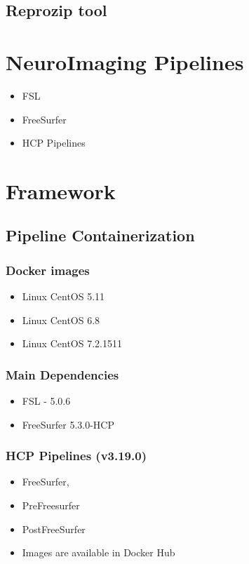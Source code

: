 \subsection{Reprozip tool}

\section{NeuroImaging Pipelines}
\begin{itemize}
 \item FSL
 \item FreeSurfer
 \item HCP Pipelines
\end{itemize}

\section{Framework}
\subsection{Pipeline Containerization}
\subsubsection{Docker images}
\begin{itemize}
  \item Linux CentOS 5.11
  \item Linux CentOS 6.8 
  \item Linux CentOS 7.2.1511
\end{itemize}

\subsubsection{Main Dependencies}
\begin{itemize}
  \item FSL - 5.0.6
  \item FreeSurfer 5.3.0-HCP
\end{itemize}

\subsubsection{HCP Pipelines (v3.19.0)}
\begin{itemize}
  \item FreeSurfer,
  \item PreFreesurfer
  \item PostFreeSurfer
  \item Images are available in Docker Hub
\end{itemize}

